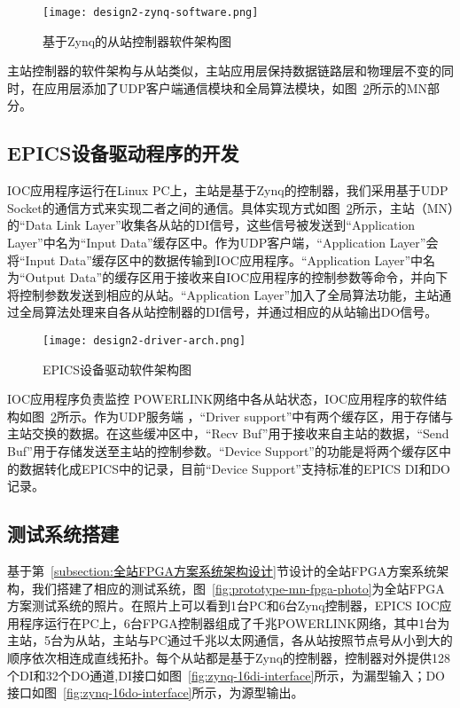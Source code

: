 \begin{figure}[htbp]
  \centering
  \texttt{[image: design2-zynq-software.png]}
  \caption{基于Zynq的从站控制器软件架构图}
  \label{fig:design2-zynq-software}
\end{figure}

主站控制器的软件架构与从站类似，主站应用层保持数据链路层和物理层不变的同时，在应用层添加了UDP客户端通信模块和全局算法模块，如图~\ref{fig:design2-driver-arch}所示的MN部分。

\subsection{EPICS设备驱动程序的开发}

IOC应用程序运行在Linux PC上，主站是基于Zynq的控制器，我们采用基于UDP Socket的通信方式来实现二者之间的通信。具体实现方式如图~\ref{fig:design2-driver-arch}所示，主站（MN）的“Data Link Layer”收集各从站的DI信号，这些信号被发送到“Application Layer”中名为“Input Data”缓存区中。作为UDP客户端，“Application Layer”会将“Input Data”缓存区中的数据传输到IOC应用程序。“Application Layer”中名为“Output Data”的缓存区用于接收来自IOC应用程序的控制参数等命令，并向下将控制参数发送到相应的从站。“Application Layer”加入了全局算法功能，主站通过全局算法处理来自各从站控制器的DI信号，并通过相应的从站输出DO信号。

\begin{figure}[htbp]
  \centering
  \texttt{[image: design2-driver-arch.png]}
  \caption{EPICS设备驱动软件架构图}
  \label{fig:design2-driver-arch}
\end{figure}

IOC应用程序负责监控 POWERLINK网络中各从站状态，IOC应用程序的软件结构如图~\ref{fig:design2-driver-arch}所示。作为UDP服务端 ，“Driver support”中有两个缓存区，用于存储与主站交换的数据。在这些缓冲区中，“Recv Buf”用于接收来自主站的数据，“Send Buf”用于存储发送至主站的控制参数。“Device Support”的功能是将两个缓存区中的数据转化成EPICS中的记录，目前“Device Support”支持标准的EPICS DI和DO记录。

\subsection{测试系统搭建}

基于第~\ref{subsection:全站FPGA方案系统架构设计}节设计的全站FPGA方案系统架构，我们搭建了相应的测试系统，图~\ref{fig:prototype-mn-fpga-photo}为全站FPGA方案测试系统的照片。在照片上可以看到1台PC和6台Zynq控制器，EPICS IOC应用程序运行在PC上，6台FPGA控制器组成了千兆POWERLINK网络，其中1台为主站，5台为从站，主站与PC通过千兆以太网通信，各从站按照节点号从小到大的顺序依次相连成直线拓扑。每个从站都是基于Zynq的控制器，控制器对外提供128个DI和32个DO通道,DI接口如图~\ref{fig:zynq-16di-interface}所示，为漏型输入；DO接口如图~\ref{fig:zynq-16do-interface}所示，为源型输出。


